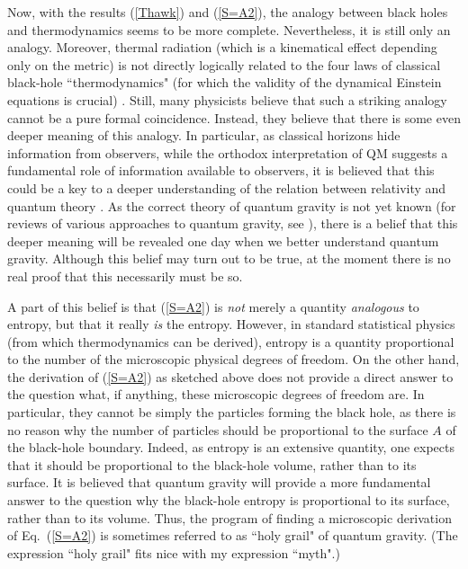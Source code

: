 \documentclass[12pt]{article}
\begin{document}
Now, with the results (\ref{Thawk}) and (\ref{S=A2}), the analogy
between black holes and thermodynamics seems to be more complete.
Nevertheless, it is still only an analogy. Moreover, 
thermal radiation (which is a kinematical effect depending 
only on the metric) is not directly logically related to the four laws 
of classical black-hole ``thermodynamics" (for which the validity
of the dynamical Einstein equations is crucial) \cite{viss}. 
Still, many physicists
believe that such a striking analogy cannot be a pure formal coincidence.
Instead, they believe that there is some even deeper meaning of this 
analogy. In particular, as classical horizons hide information from 
observers, while the orthodox interpretation of QM suggests a 
fundamental role of information available to observers, it is   
believed that this could be a key to a deeper understanding
of the relation between relativity and quantum theory \cite{peres}. 
As the correct theory of quantum gravity is not yet 
known (for reviews of various approaches to quantum gravity, 
see \cite{carl,alvar}), there is a belief that this deeper 
meaning will be revealed one day when we better
understand quantum gravity. Although this belief may turn out 
to be true, at the moment there is no real proof that this 
necessarily must be so.  

A part of this belief is that (\ref{S=A2}) is {\em not} merely
a quantity {\em analogous} to entropy, but that it really {\em is}
the entropy. However, in standard statistical physics (from which 
thermodynamics can be derived), entropy is a quantity 
proportional to the number of the microscopic physical degrees of 
freedom. On the other hand, the derivation of (\ref{S=A2})
as sketched above does not provide a direct answer to the 
question what, if anything, these microscopic degrees of freedom are.
In particular, they cannot be simply the particles forming
the black hole, as there is no reason why the number of particles 
should be proportional to the surface $A$ of the black-hole boundary.
Indeed, as entropy is an extensive quantity, one expects 
that it should be proportional to the black-hole volume, rather 
than to its surface. It is believed that quantum gravity
will provide a more fundamental answer to the question
why the black-hole entropy is proportional to its surface, 
rather than to its volume.
Thus, the program of finding a microscopic derivation
of Eq.~(\ref{S=A2}) is sometimes referred to as  
``holy grail" of quantum gravity. (The expression ``holy grail"
fits nice with my expression ``myth".)    
\end{document}
